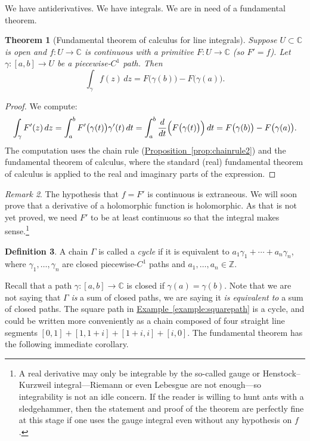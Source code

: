 \documentclass[12pt,openany]{book}
\newcommand{\C}{{\mathbb{C}}}
\newcommand{\Z}{{\mathbb{Z}}}
\newcommand{\myindex}[1]{#1\index{#1}}
\theoremstyle{plain}
\newtheorem{thm}{Theorem}[section]
\theoremstyle{remark}
\newtheorem{remark}[thm]{Remark}
\theoremstyle{definition}
\newtheorem{defn}[thm]{Definition}
\theoremstyle{exercise}
\theoremstyle{example}
\newcommand{\exampleref}[1]{\hyperref[#1]{Example~\ref*{#1}}}
\newcommand{\propref}[1]{\hyperref[#1]{Proposition~\ref*{#1}}}
\begin{document}
We have antiderivatives.  We have integrals.  We are in need of a
fundamental theorem.

\begin{thm}[Fundamental theorem of calculus for line integrals]
%
Suppose $U \subset \C$ is open and $f \colon U \to \C$
is continuous with a primitive $F \colon U \to \C$ (so $F' = f$).
Let $\gamma \colon [a,b] \to U$ be a piecewise-$C^1$ path.
Then
\begin{equation*}
\int_\gamma f(z) \, dz =
F\bigl( \gamma(b) \bigr) - F\bigl( \gamma(a)
\bigr) .
\end{equation*}
\end{thm}

\begin{proof}
We compute:
\begin{equation*}
\int_\gamma F'(z) \, dz
=
\int_a^b F'\bigl(\gamma(t)\bigr) \gamma'(t) \, dt 
=
\int_a^b \frac{d}{dt} \Bigl( F\bigl(\gamma(t)\bigr) \Bigr) \, dt 
=
F\bigl( \gamma(b) \bigr) - F\bigl( \gamma(a) \bigr) .
\end{equation*}
The computation uses the chain rule (\propref{prop:chainrule2})
and the fundamental theorem of calculus, where the
standard (real) fundamental theorem of calculus is applied to the real and imaginary parts
of the expression.
\end{proof}

\begin{remark}
The hypothesis that $f=F'$ is continuous is extraneous.
We will soon prove that a derivative of a holomorphic function is
holomorphic.  As that is not yet proved, we need $F'$ to be at least
continuous so that the integral makes sense.\footnote{%
A real derivative may only be integrable
by the so-called gauge or Henstock--Kurzweil integral---Riemann or
even Lebesgue are not enough---so integrability is not an idle concern.
If the reader is willing to hunt ants with a sledgehammer, then
the statement and proof of the theorem are perfectly fine at this stage
if one uses the gauge integral even without any hypothesis on $f$.}
\end{remark}

\begin{defn}
A chain $\Gamma$ 
is called a \emph{\myindex{cycle}} if
it is equivalent to
$a_1 \gamma_1 + \cdots + a_n \gamma_n$, where $\gamma_1, \ldots, \gamma_n$
are closed piecewise-$C^1$ paths
and $a_1,\ldots,a_n \in \Z$.
\end{defn}

Recall that a path $\gamma \colon [a,b] \to \C$ is closed if $\gamma(a) = \gamma(b)$.
Note that we are not saying that $\Gamma$ \emph{is} a sum of closed
paths, we are saying it
\emph{is equivalent to} a sum of closed paths.  The square path in
\exampleref{example:squarepath} is a cycle, and could be written more
conveniently as a chain composed of four straight line segments $[0,1] +
[1,1+i]+[1+i,i]+[i,0]$.
The fundamental theorem has the following
immediate corollary.
\end{document}
